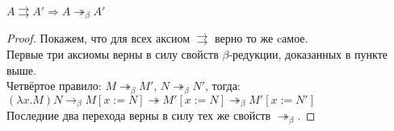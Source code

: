 \begin{lemma}
$A \rightrightarrows A' \Rightarrow A \twoheadrightarrow_\beta A'$
\end{lemma}
\begin{proof}
Покажем, что для всех аксиом $\rightrightarrows$ верно то же cамое. \\
Первые три аксиомы верны в силу свойств $\beta$-редукции, доказанных в пункте
выше. \\
Четвёртое правило: $M \twoheadrightarrow_\beta M'$, $N \twoheadrightarrow_\beta
N'$, тогда: \\
$(\lambda x . M) N \to_\beta M[x:=N] \twoheadrightarrow M'[x:=N]
\twoheadrightarrow_\beta M'[x:=N']$ \\
Последние два перехода верны в силу тех же свойств $\twoheadrightarrow_\beta$.
\end{proof}
